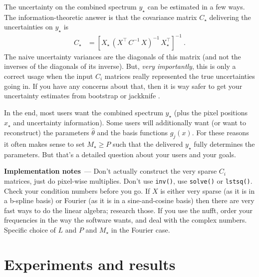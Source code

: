 \documentclass[11pt]{article}
\renewcommand{\paragraph}[1]{\medskip\par\noindent\textbf{#1}~---}
\begin{document}
The uncertainty on the combined spectrum $y_\star$ can be estimated in a few ways.
The information-theoretic answer is that the covariance matrix $C_\star$ delivering the uncertainties on $y_\star$ is
\begin{align}
    C_\star &= [X_\star\,(X^\top\,C^{-1}\,X)^{-1}\,X_\star^\top]^{-1} ~.
\end{align}
The naive uncertainty variances are the diagonals of this matrix (and not the inverses of the diagonals of its inverse).
But, \emph{very importantly}, this is only a correct usage when the input $C_i$ matrices really represented the true uncertainties going in.
If you have any concerns about that, then it is way safer to get your uncertainty estimates from bootstrap or jackknife \cite{hoggflexible}.

In the end, most users want the combined spectrum $y_\star$ (plus the pixel positions $x_\star$ and uncertainty information).
Some users will additionally want (or want to reconstruct) the parameters $\hat\theta$ and the basis functions $g_j(x)$.
For these reasons it often makes sense to set $M_\star\geq P$ such that the delivered $y_\star$ fully determines the parameters.
But that's a detailed question about your users and your goals.

\paragraph{Implementation notes}
Don't actually construct the very sparse $C_i$ matrices, just do pixel-wise multiplies.
Don't use \texttt{inv()}, use \texttt{solve()} or \texttt{lstsq()}.
Check your condition numbers before you go.
If $X$ is either very sparse (as it is in a b-spline basis) or Fourier (as it is in a sine-and-cosine basis) then there are very fast ways to do the linear algebra; research those.
If you use the nufft, order your frequencies in the way the software wants, and deal with the complex numbers.
Specific choice of $L$ and $P$ and $M_\star$ in the Fourier case.

\section{Experiments and results}\label{sec:results}
\end{document}

